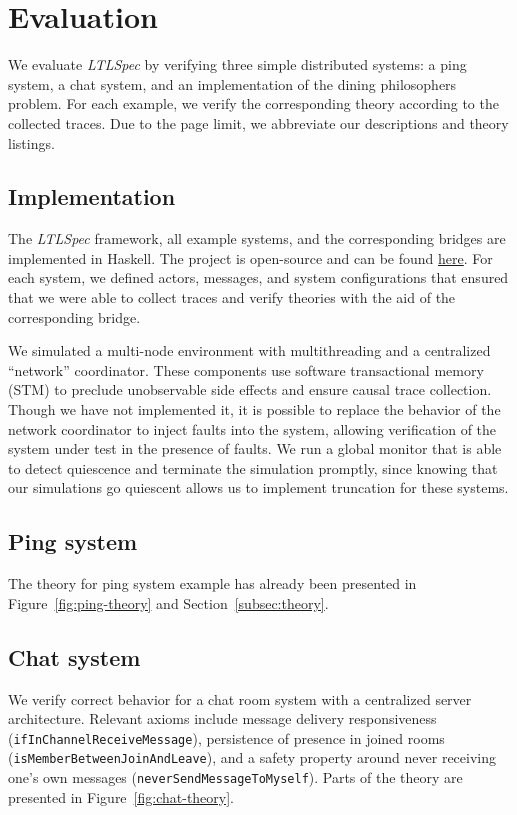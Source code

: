 \documentclass[format=acmsmall, nonacm=true, review=true, screen=true]{acmart}
\newcommand{\ltlspec}{\textit{LTLSpec}\xspace}
\begin{document}
\section{Evaluation}

We evaluate \ltlspec by verifying three simple distributed systems: a ping system, a chat system, and an implementation of the dining philosophers problem. For each example, we verify the corresponding theory according to the collected traces. Due to the page limit, we abbreviate our descriptions and theory listings.

\subsection{Implementation}

The \ltlspec framework, all example systems, and the corresponding bridges are implemented in Haskell.
The project is open-source and can be found \href{https://github.com/ejconlon/ltlspec}{here}.
For each system, we defined actors, messages, and system configurations that ensured that we were able to collect traces and verify theories with the aid of the corresponding bridge.

We simulated a multi-node environment with multithreading and a centralized ``network'' coordinator.
These components use software transactional memory (STM) \cite{harris2005composable} to preclude unobservable side effects and ensure causal trace collection.
Though we have not implemented it, it is possible to replace the behavior of the network coordinator to inject faults into the system, allowing verification of the system under test in the presence of faults.
We run a global monitor that is able to detect quiescence and terminate the simulation promptly, since knowing that our simulations go quiescent allows us to implement truncation for these systems.

\subsection{Ping system}

The theory for ping system example has already been presented in Figure~\ref{fig:ping-theory} and Section~\ref{subsec:theory}.

\subsection{Chat system}

We verify correct behavior for a chat room system with a centralized server architecture.
Relevant axioms include message delivery responsiveness (\texttt{ifInChannelReceiveMessage}), persistence of presence in joined rooms (\texttt{isMemberBetweenJoinAndLeave}), and a safety property around never receiving one's own messages (\texttt{neverSendMessageToMyself}). Parts of the theory are presented in Figure~\ref{fig:chat-theory}.
\end{document}
